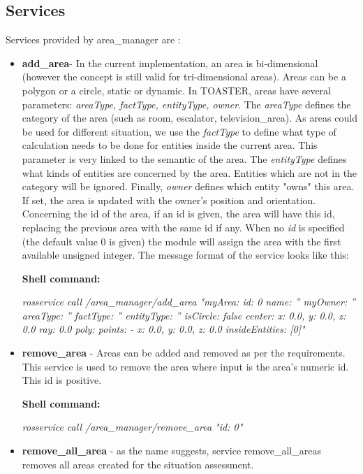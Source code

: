 \documentclass[a4paper]{article}
\begin{document}
\subsection{Services}
Services provided by area\_manager are :
\begin{itemize}
\item \textbf{add\_area}- In the current implementation, an area is bi-dimensional (however the concept is still valid for tri-dimensional areas). Areas can be a polygon or a circle, static or dynamic. In TOASTER, areas have several parameters: \textit{areaType, factType, entityType, owner}. The \textit{areaType} defines the category of the area (such as room, escalator, television\_area). As areas could be used for different situation, we use the \textit{factType} to define what type of calculation needs to be done for entities inside the current area. This parameter is very linked to the semantic of the area. The \textit{entityType} defines what kinds of entities are concerned by the area. Entities which are not in the category will be ignored. Finally, \textit{owner} defines which entity "owns" this area. If set, the area is updated with the owner's position and orientation. Concerning the id of the area, if an id is given, the area will have this id, replacing the previous area with the same id if any. When no \textit{id} is specified (the default value 0 is given) the module will assign the area with the first available unsigned integer. The message format of the service looks like this:

\textbf{Shell command:}

\textit{rosservice call /area\_manager/add\_area "myArea:
  id: 0
  name: ''
  myOwner: ''
  areaType: ''
  factType: ''
  entityType: ''
  isCircle: false
  center: {x: 0.0, y: 0.0, z: 0.0}
  ray: 0.0
  poly:
    points:
    - {x: 0.0, y: 0.0, z: 0.0}
  insideEntities: [0]" }
  
\item \textbf{remove\_area} - Areas can be added and removed as per the requirements. This service is used to remove the area where input is the area's numeric id. This id is positive.

\textbf{Shell command:}

\textit{rosservice call /area\_manager/remove\_area "id: 0"}


\item \textbf{remove\_all\_area }- as the name suggests, service remove\_all\_areas removes all areas created for the situation assessment.


\end{itemize}
\end{document}
